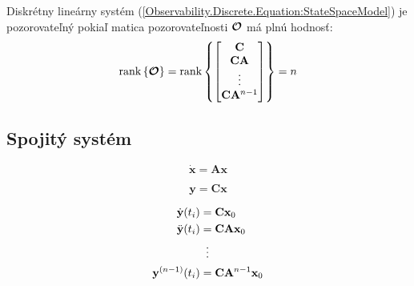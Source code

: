 \documentclass[a4paper, 10pt, ]{article}
\begin{document}
\begin{theorem}
    Diskrétny lineárny systém (\ref{Observability.Discrete.Equation:StateSpaceModel}) je pozorovateľný pokiaľ matica pozorovateľnosti $\boldsymbol{\mathcal{O}}$ má plnú hodnosť:
    \begin{equation}
        \label{Observability.Discrete.Equation:ObservabilityTheorem}
        \mathrm{rank} \left\{ \boldsymbol{\mathcal{O}} \right\} = 
        \mathrm{rank} \left\{
            \begin{bmatrix}
                \mathbf{C}                \\
                \mathbf{C} \mathbf{A}         \\
                \vdots                \\
                \mathbf{C} \mathbf{A}^{n - 1} \\
            \end{bmatrix}
        \right\} = 
        n
    \end{equation}
\end{theorem}


\subsection{Spojitý systém}

\begin{equation}
    \label{Observability.Continuous.Equation:StateSpaceModel}
    \dot{\bm{x}} = \bm{A} \bm{x}
\end{equation}

\begin{equation}
    \bm{y} = \bm{C} \bm{x}
\end{equation}

\begin{subequations}
    \begin{align}
        \dot{\bm{y}}(t_i)     &= \bm{C} \bm{x}_{0}                \\
        \ddot{\bm{y}}(t_i)    &= \bm{C} \bm{A} \bm{x}_{0}         \\
        &\vdotswithin{=}                                          \\
        \bm{y}^{(n - 1)}(t_i) &= \bm{C} \bm{A}^{n - 1} \bm{x}_{0}
    \end{align}
\end{subequations}
\end{document}
